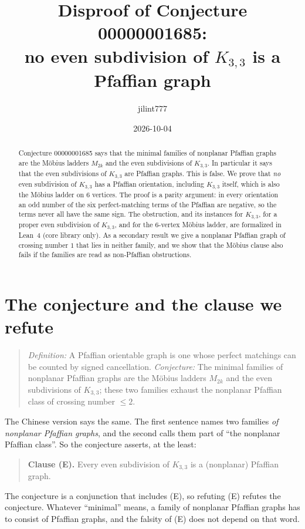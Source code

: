 \documentclass[11pt]{article}
\title{Disproof of Conjecture 00000001685:\\
no even subdivision of $K_{3,3}$ is a Pfaffian graph}
\author{jilint777}
\date{2026-10-04}
\theoremstyle{definition}
\theoremstyle{remark}
\begin{document}
\sloppy
\maketitle

\begin{abstract}
Conjecture 00000001685 says that the minimal families of nonplanar Pfaffian graphs
are the M\"obius ladders $M_{2k}$ and the even subdivisions of $K_{3,3}$. In
particular it says that the even subdivisions of $K_{3,3}$ are Pfaffian graphs.
This is false. We prove that \emph{no} even subdivision of $K_{3,3}$ has a Pfaffian
orientation, including $K_{3,3}$ itself, which is also the M\"obius ladder on $6$
vertices. The proof is a parity argument: in every orientation an odd number of
the six perfect-matching terms of the Pfaffian are negative, so the terms never
all have the same sign. The obstruction, and its instances for $K_{3,3}$, for a
proper even subdivision of $K_{3,3}$, and for the $6$-vertex M\"obius ladder, are
formalized in Lean~4 (core library only). As a secondary result we give a
nonplanar Pfaffian graph of crossing number $1$ that lies in neither family, and
we show that the M\"obius clause also fails if the families are read as
non-Pfaffian obstructions.
\end{abstract}

\section{The conjecture and the clause we refute}
\begin{quote}
\emph{Definition:} A Pfaffian orientable graph is one whose perfect matchings can
be counted by signed cancellation. \emph{Conjecture:} The minimal families of
nonplanar Pfaffian graphs are the M\"obius ladders $M_{2k}$ and the even
subdivisions of $K_{3,3}$; these two families exhaust the nonplanar Pfaffian class
of crossing number $\le 2$.
\end{quote}
The Chinese version says the same. The first sentence names two families
\emph{of nonplanar Pfaffian graphs}, and the second calls them part of ``the
nonplanar Pfaffian class''. So the conjecture asserts, at the least:

\begin{quote}
\textbf{Clause (E).} Every even subdivision of $K_{3,3}$ is a (nonplanar) Pfaffian graph.
\end{quote}

The conjecture is a conjunction that includes (E), so refuting (E) refutes the
conjecture. Whatever ``minimal'' means, a family of nonplanar Pfaffian graphs
has to consist of Pfaffian graphs, and the falsity of (E) does not depend on that
word.
\end{document}
